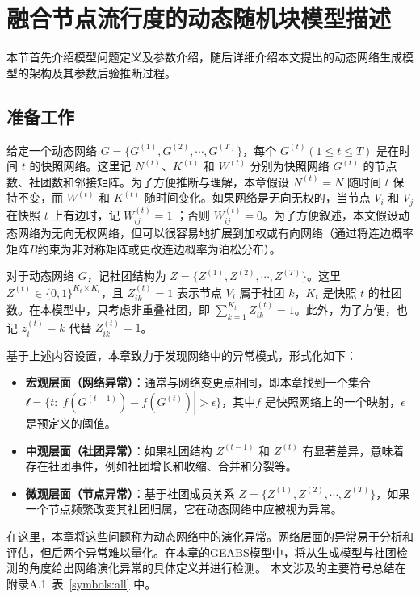 \section{融合节点流行度的动态随机块模型描述\label{chap4:model}}

\label{sec:method}
本节首先介绍模型问题定义及参数介绍，随后详细介绍本文提出的动态网络生成模型的架构及其参数后验推断过程。


\subsection{准备工作}
给定一个动态网络 $G =\{ G^{(1)}, G^{(2)}, \cdots, G^{(T)} \}$，每个 $G^{(t)} (1 \le t \le T)$ 是在时间 $t$ 的快照网络。这里记 $N^{(t)}$、$K^{(t)}$ 和 $W^{(t)}$ 分别为快照网络 $G^{(t)}$ 的节点数、社团数和邻接矩阵。为了方便推断与理解，本章假设 $N^{(t)} = N$ 随时间 $t$ 保持不变，而 $W^{(t)}$ 和 $K^{(t)}$ 随时间变化。如果网络是无向无权的，当节点 $V_i$ 和 $V_j$ 在快照 $t$ 上有边时，记 $W^{(t)}_{ij} = 1$ ；否则 $W^{(t)}_{ij} = 0$。为了方便叙述，本文假设动态网络为无向无权网络，但可以很容易地扩展到加权或有向网络（通过将连边概率矩阵$B$约束为非对称矩阵或更改连边概率为泊松分布）。

对于动态网络 $G$，记社团结构为 $Z = \{ Z^{(1)}, Z^{(2)}, \cdots, Z^{(T)} \}$。这里 $Z^{(t)} \in \{0, 1 \}^{K_t \times K_t}$，且 $Z^{(t)}_{ik} = 1$ 表示节点 $V_i$ 属于社团 $k$，$K_t$ 是快照 $t$ 的社团数。在本模型中，只考虑非重叠社团，即 $\sum_{k=1}^{K_t} Z^{(t)}_{ik} = 1$。此外，为了方便，也记 $z^{(t)}_{i} = k$ 代替 $Z^{(t)}_{ik} = 1$。



基于上述内容设置，本章致力于发现网络中的异常模式，形式化如下：
\begin{itemize}
    \item \textbf{宏观层面（网络异常）}：通常与网络变更点相同，即本章找到一个集合 $\mathcal{t} = \{t : |f(G^{(t-1)}) -f(G^{(t)})| > \epsilon  \} $，其中$f$ 是快照网络上的一个映射，$\epsilon$是预定义的阈值。
    \item \textbf{中观层面（社团异常）}：如果社团结构 $Z^{(t-1)}$ 和 $Z^{(t)}$ 有显著差异，意味着存在社团事件，例如社团增长和收缩、合并和分裂等。
    \item \textbf{微观层面（节点异常）}：基于社团成员关系 $Z = \{ Z^{(1)}, Z^{(2)}, \cdots, Z^{(T)} \}$，如果一个节点频繁改变其社团归属，它在动态网络中应被视为异常。
\end{itemize}

在这里，本章将这些问题称为动态网络中的演化异常。网络层面的异常易于分析和评估，但后两个异常难以量化。在本章的GEABS模型中，将从生成模型与社团检测的角度给出网络演化异常的具体定义并进行检测。
本文涉及的主要符号总结在附录A.1~表~\ref{symbols:all} 中。

